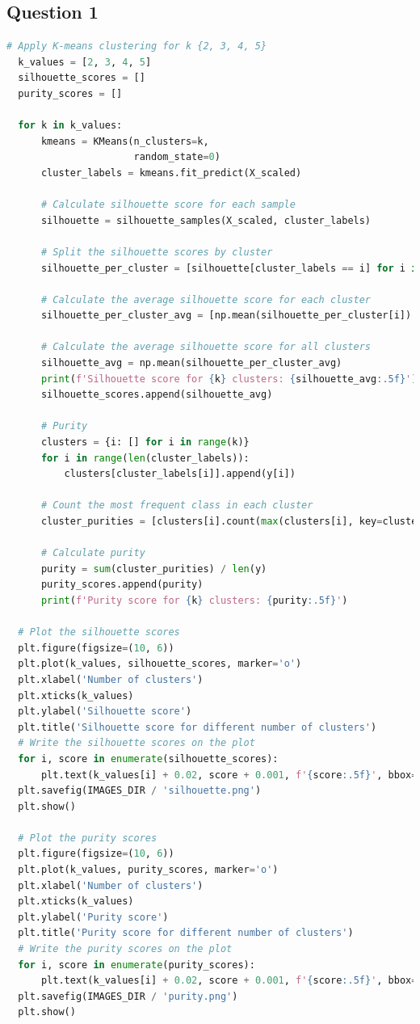 \documentclass{article}
\begin{document}
\subsection*{Question 1}
\begin{lstlisting}[language=Python]
  # Apply K-means clustering for k {2, 3, 4, 5}
  k_values = [2, 3, 4, 5]
  silhouette_scores = []
  purity_scores = []
  
  for k in k_values:
      kmeans = KMeans(n_clusters=k,
                      random_state=0)
      cluster_labels = kmeans.fit_predict(X_scaled)
  
      # Calculate silhouette score for each sample
      silhouette = silhouette_samples(X_scaled, cluster_labels)
  
      # Split the silhouette scores by cluster
      silhouette_per_cluster = [silhouette[cluster_labels == i] for i in range(k)]
  
      # Calculate the average silhouette score for each cluster
      silhouette_per_cluster_avg = [np.mean(silhouette_per_cluster[i]) for i in range(k)]
  
      # Calculate the average silhouette score for all clusters
      silhouette_avg = np.mean(silhouette_per_cluster_avg)
      print(f'Silhouette score for {k} clusters: {silhouette_avg:.5f}')
      silhouette_scores.append(silhouette_avg)
  
      # Purity
      clusters = {i: [] for i in range(k)}
      for i in range(len(cluster_labels)):
          clusters[cluster_labels[i]].append(y[i])
  
      # Count the most frequent class in each cluster
      cluster_purities = [clusters[i].count(max(clusters[i], key=clusters[i].count)) for i in range(k)]
  
      # Calculate purity
      purity = sum(cluster_purities) / len(y)
      purity_scores.append(purity)
      print(f'Purity score for {k} clusters: {purity:.5f}')
  
  # Plot the silhouette scores
  plt.figure(figsize=(10, 6))
  plt.plot(k_values, silhouette_scores, marker='o')
  plt.xlabel('Number of clusters')
  plt.xticks(k_values)
  plt.ylabel('Silhouette score')
  plt.title('Silhouette score for different number of clusters')
  # Write the silhouette scores on the plot
  for i, score in enumerate(silhouette_scores):
      plt.text(k_values[i] + 0.02, score + 0.001, f'{score:.5f}', bbox=dict(facecolor='white', alpha=0.8))
  plt.savefig(IMAGES_DIR / 'silhouette.png')
  plt.show()
  
  # Plot the purity scores
  plt.figure(figsize=(10, 6))
  plt.plot(k_values, purity_scores, marker='o')
  plt.xlabel('Number of clusters')
  plt.xticks(k_values)
  plt.ylabel('Purity score')
  plt.title('Purity score for different number of clusters')
  # Write the purity scores on the plot
  for i, score in enumerate(purity_scores):
      plt.text(k_values[i] + 0.02, score + 0.001, f'{score:.5f}', bbox=dict(facecolor='white', alpha=0.5))
  plt.savefig(IMAGES_DIR / 'purity.png')
  plt.show()
\end{lstlisting}
\end{document}
